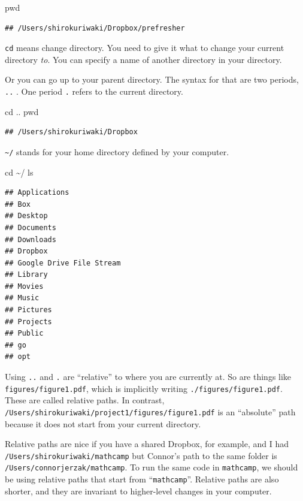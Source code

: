 \documentclass[
]{book}
\newenvironment{Shaded}{\begin{snugshade}}{\end{snugshade}}
\newcommand{\BuiltInTok}[1]{#1}
\newcommand{\FunctionTok}[1]{\textcolor[rgb]{0.00,0.00,0.00}{#1}}
\newcommand{\NormalTok}[1]{#1}
\theoremstyle{definition}
\theoremstyle{definition}
\theoremstyle{definition}
\theoremstyle{remark}
\begin{document}
\begin{Shaded}
\begin{Highlighting}[]
\BuiltInTok{pwd}
\end{Highlighting}
\end{Shaded}

\begin{verbatim}
## /Users/shirokuriwaki/Dropbox/prefresher
\end{verbatim}

\texttt{cd} means change directory. You need to give it what to change your current directory \emph{to}. You can specify a name of another directory in your directory.

Or you can go up to your parent directory. The syntax for that are two periods, \texttt{..} . One period \texttt{.} refers to the current directory.

\begin{Shaded}
\begin{Highlighting}[]
\BuiltInTok{cd}\NormalTok{ ..}
\BuiltInTok{pwd}
\end{Highlighting}
\end{Shaded}

\begin{verbatim}
## /Users/shirokuriwaki/Dropbox
\end{verbatim}

\texttt{\textasciitilde{}/} stands for your home directory defined by your computer.

\begin{Shaded}
\begin{Highlighting}[]
\BuiltInTok{cd}\NormalTok{ \textasciitilde{}/}
\FunctionTok{ls}
\end{Highlighting}
\end{Shaded}

\begin{verbatim}
## Applications
## Box
## Desktop
## Documents
## Downloads
## Dropbox
## Google Drive File Stream
## Library
## Movies
## Music
## Pictures
## Projects
## Public
## go
## opt
\end{verbatim}

Using \texttt{..} and \texttt{.} are ``relative'' to where you are currently at. So are things like \texttt{figures/figure1.pdf}, which is implicitly writing \texttt{./figures/figure1.pdf}. These are called relative paths. In contrast, \texttt{/Users/shirokuriwaki/project1/figures/figure1.pdf} is an ``absolute'' path because it does not start from your current directory.

Relative paths are nice if you have a shared Dropbox, for example, and I had \texttt{/Users/shirokuriwaki/mathcamp} but Connor's path to the same folder is \texttt{/Users/connorjerzak/mathcamp}. To run the same code in \texttt{mathcamp}, we should be using relative paths that start from ``\texttt{mathcamp}''. Relative paths are also shorter, and they are invariant to higher-level changes in your computer.
\end{document}
